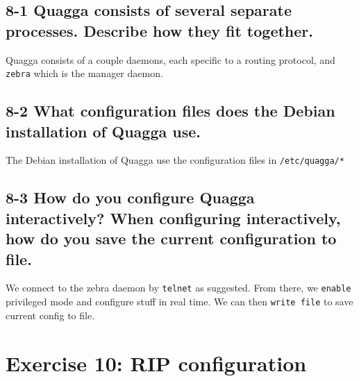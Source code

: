 \subsection{8-1 Quagga consists of several separate processes. Describe how they fit together.}
Quagga consists of a couple daemons, each specific to a routing protocol, and \verb=zebra= which is the manager daemon.

\subsection{8-2 What configuration files does the Debian installation of Quagga use.}
The Debian installation of Quagga use the configuration files in \verb=/etc/quagga/*=

\subsection{8-3 How do you configure Quagga interactively? When configuring interactively, how do you save the current configuration to file.}

We connect to the zebra daemon by \verb=telnet= as suggested. From there, we \verb=enable= privileged mode and configure stuff in real time. We can then \verb=write file= to save current config to file.



\section{Exercise 10: RIP configuration}

